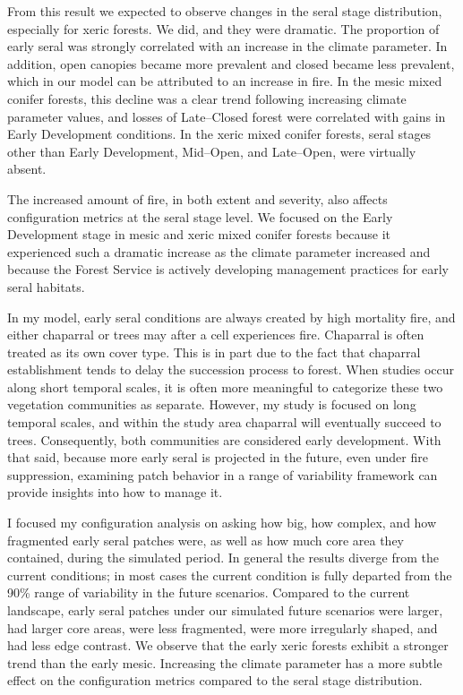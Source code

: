 From this result we expected to observe changes in the seral stage distribution, especially for xeric forests. We did, and they were dramatic. The proportion of early seral was strongly correlated with an increase in the climate parameter. In addition, open canopies became more prevalent and closed became less prevalent, which in our model can be attributed to an increase in fire. In the mesic mixed conifer forests, this decline was a clear trend following increasing climate parameter values, and losses of Late--Closed forest were correlated with gains in Early Development conditions. In the xeric mixed conifer forests, seral stages other than Early Development, Mid--Open, and Late--Open, were virtually absent.

The increased amount of fire, in both extent and severity, also affects configuration metrics at the seral stage level. We focused on the Early Development stage in mesic and xeric mixed conifer forests because it experienced such a dramatic increase as the climate parameter increased and because the Forest Service is actively developing management practices for early seral habitats. 

In my model, early seral conditions are always created by high mortality fire, and either chaparral or trees may after a cell experiences fire. Chaparral is often treated as its own cover type. This is in part due to the fact that chaparral establishment tends to delay the succession process to forest. When studies occur along short temporal scales, it is often more meaningful to categorize these two vegetation communities as separate. However, my study is focused on long temporal scales, and within the study area chaparral will eventually succeed to trees. Consequently, both communities are considered early development. With that said, because more early seral is projected in the future, even under fire suppression, examining patch behavior in a range of variability framework can provide insights into how to manage it.

I focused my configuration analysis on asking how big, how complex, and how fragmented early seral patches were, as well as how much core area they contained, during the simulated period. In general the results diverge from the current conditions; in most cases the current condition is fully departed from the 90\% range of variability in the future scenarios. Compared to the current landscape, early seral patches under our simulated future scenarios were larger, had larger core areas, were less fragmented, were more irregularly shaped, and had less edge contrast. We observe that the early xeric forests exhibit a stronger trend than the early mesic. Increasing the climate parameter has a more subtle effect on the configuration metrics compared to the seral stage distribution.

